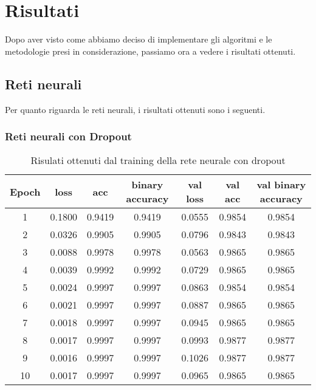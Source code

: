 \section{Risultati}
Dopo aver visto come abbiamo deciso di implementare gli algoritmi e le metodologie presi in considerazione, passiamo ora a vedere i risultati ottenuti.
\subsection{Reti neurali}
Per quanto riguarda le reti neurali, i risultati ottenuti sono i seguenti.
\subsubsection{Reti neurali con Dropout}
\renewcommand{\arraystretch}{1.4}
\begin{table}[H]
	\begin{center}
		\begin{tabular}{|c|c|c|c|c|c|c|}
			\hline
				\textbf{Epoch} & \textbf{loss}    & \textbf{acc} & \textbf{binary accuracy} & \textbf{val loss} & \textbf{val acc} & \textbf{val binary accuracy}\\ \hline
				1 & 0.1800 & 0.9419 & 0.9419 & 0.0555 & 0.9854 & 0.9854 \\ \hline
				2 & 0.0326 & 0.9905 & 0.9905 & 0.0796 & 0.9843 & 0.9843 \\ \hline
				3 & 0.0088 & 0.9978 & 0.9978 & 0.0563 & 0.9865 & 0.9865 \\ \hline
				4 & 0.0039 & 0.9992 & 0.9992 & 0.0729 & 0.9865 & 0.9865 \\ \hline
				5 & 0.0024 & 0.9997 & 0.9997 & 0.0863 & 0.9854 & 0.9854 \\ \hline
				6 & 0.0021 & 0.9997 & 0.9997 & 0.0887 & 0.9865 & 0.9865 \\ \hline
				7 & 0.0018 & 0.9997 & 0.9997 & 0.0945 & 0.9865 & 0.9865 \\ \hline
				8 & 0.0017 & 0.9997 & 0.9997 & 0.0993 & 0.9877 & 0.9877 \\ \hline
				9 & 0.0016 & 0.9997 & 0.9997 & 0.1026 & 0.9877 & 0.9877 \\ \hline
				10 & 0.0017 & 0.9997 & 0.9997 & 0.0965 & 0.9865 & 0.9865 \\ \hline
		\end{tabular}
		\caption{Risulati ottenuti dal training della rete neurale con dropout\label{}}
	\end{center}
\end{table}
\renewcommand{\arraystretch}{1}

